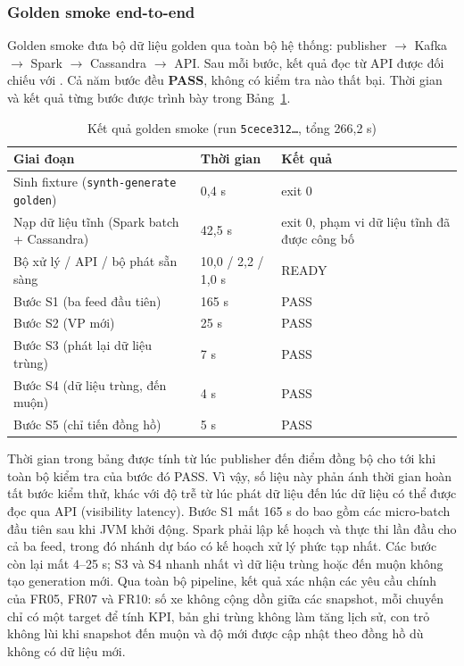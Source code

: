 \subsubsection{Golden smoke end-to-end}

Golden smoke đưa bộ dữ liệu golden qua toàn bộ hệ thống: publisher $\rightarrow$ Kafka $\rightarrow$ Spark $\rightarrow$ Cassandra $\rightarrow$ API. Sau mỗi bước, kết quả đọc từ API được đối chiếu với . Cả năm bước đều \textbf{PASS}, không có kiểm tra nào thất bại. Thời gian và kết quả từng bước được trình bày trong Bảng~\ref{tab:goldenrun}.

\begin{table}[H]
\centering
\tablefont
\caption{Kết quả golden smoke (run \texttt{5cece312\ldots}, tổng 266,2 s)}
\label{tab:goldenrun}
\begin{tabular}{p{6.21cm}p{2.32cm}p{6.60cm}}
\toprule
\textbf{Giai đoạn} & \textbf{Thời gian} & \textbf{Kết quả} \\
\midrule
Sinh fixture (\texttt{synth-generate golden}) & 0,4 s & exit 0 \\
Nạp dữ liệu tĩnh (Spark batch + Cassandra) & 42,5 s & exit 0, phạm vi dữ liệu tĩnh đã được công bố \\
Bộ xử lý / API / bộ phát sẵn sàng & 10,0 / 2,2 / 1,0 s & READY \\
Bước S1 (ba feed đầu tiên) & 165 s & PASS \\
Bước S2 (VP mới) & 25 s & PASS \\
Bước S3 (phát lại dữ liệu trùng) & 7 s & PASS \\
Bước S4 (dữ liệu trùng, đến muộn) & 4 s & PASS \\
Bước S5 (chỉ tiến đồng hồ) & 5 s & PASS \\
\bottomrule
\end{tabular}
\end{table}

Thời gian trong bảng được tính từ lúc publisher đến điểm đồng bộ cho tới khi toàn bộ kiểm tra của bước đó PASS. Vì vậy, số liệu này phản ánh thời gian hoàn tất bước kiểm thử, khác với độ trễ từ lúc phát dữ liệu đến lúc dữ liệu có thể được đọc qua API (visibility latency). Bước S1 mất 165 s do bao gồm các micro-batch đầu tiên sau khi JVM khởi động. Spark phải lập kế hoạch và thực thi lần đầu cho cả ba feed, trong đó nhánh dự báo có kế hoạch xử lý phức tạp nhất. Các bước còn lại mất 4--25 s; S3 và S4 nhanh nhất vì dữ liệu trùng hoặc đến muộn không tạo generation mới. Qua toàn bộ pipeline, kết quả xác nhận các yêu cầu chính của FR05, FR07 và FR10: số xe không cộng dồn giữa các snapshot, mỗi chuyến chỉ có một target để tính KPI, bản ghi trùng không làm tăng lịch sử, con trỏ không lùi khi snapshot đến muộn và độ mới được cập nhật theo đồng hồ dù không có dữ liệu mới.

